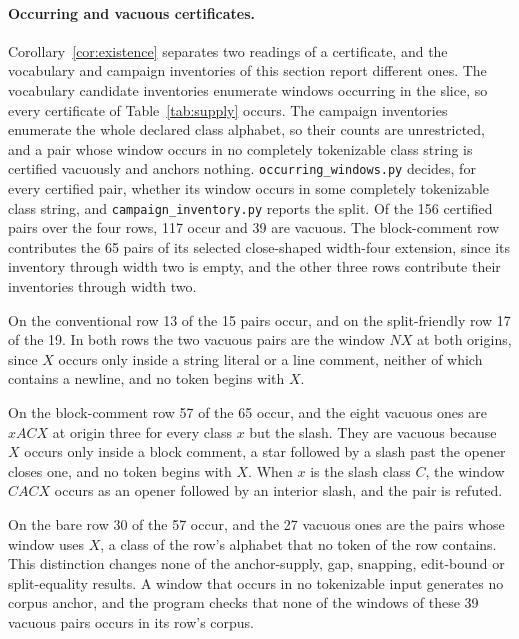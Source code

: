 \documentclass[11pt,a4paper]{article}
\theoremstyle{definition}
\theoremstyle{plain}
\newcommand{\code}[1]{\texttt{#1}}
\begin{document}
\paragraph{Occurring and vacuous certificates.} Corollary~\ref{cor:existence} separates two readings of a certificate,
and the vocabulary and campaign inventories of this section report different ones. The vocabulary candidate inventories
enumerate windows occurring in the slice, so every certificate of Table~\ref{tab:supply} occurs. The campaign
inventories enumerate the whole declared class alphabet, so their counts are unrestricted, and a pair whose window
occurs in no completely tokenizable class string is certified vacuously and anchors nothing.
\code{occurring\_windows.py} decides, for every certified pair, whether its window occurs in some completely tokenizable
class string, and \code{campaign\_inventory.py} reports the split. Of the 156 certified pairs over the four rows, 117
occur and 39 are vacuous. The block-comment row contributes the 65 pairs of its selected close-shaped width-four
extension, since its inventory through width two is empty, and the other three rows contribute their inventories through
width two.

On the conventional row 13 of the 15 pairs occur, and on the split-friendly row 17 of the 19. In both rows the two
vacuous pairs are the window $NX$ at both origins, since $X$ occurs only inside a string literal or a line comment,
neither of which contains a newline, and no token begins with $X$.

On the block-comment row 57 of the 65 occur, and the eight vacuous ones are $xACX$ at origin three for every class $x$
but the slash. They are vacuous because $X$ occurs only inside a block comment, a star followed by a slash past the
opener closes one, and no token begins with $X$. When $x$ is the slash class $C$, the window $CACX$ occurs as an opener
followed by an interior slash, and the pair is refuted.

On the bare row 30 of the 57 occur, and the 27 vacuous ones are the pairs whose window uses $X$, a class of the row's
alphabet that no token of the row contains. This distinction changes none of the anchor-supply, gap, snapping,
edit-bound or split-equality results. A window that occurs in no tokenizable input generates no corpus anchor, and the
program checks that none of the windows of these 39 vacuous pairs occurs in its row's corpus.
\end{document}
